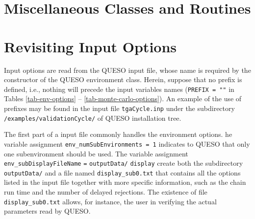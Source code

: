 \section{Miscellaneous Classes and Routines}

% 
% 
% 



\section{Revisiting Input Options}

Input options are read from the QUESO input file, whose name is required by the constructor of the QUESO environment class. Herein, suppose that no prefix is defined, i.e., nothing will precede the input variables names (\verb+PREFIX = ""+ in Tables \ref{tab-env-options} -- \ref{tab-monte-carlo-options}). An example of the use of prefixes may be found in the input file \texttt{tgaCycle.inp} under the subdirectory  \texttt{/examples/validationCycle/} of QUESO installation tree.

The first part of a input file commonly handles the environment options. he variable assignment \verb+env_numSubEnvironments = 1+ indicates to QUESO that only one subenvironment should be used. The variable assignment \texttt{env\_subDisplayFileName} \texttt{=} \texttt{outputData/} \texttt{display} create both the subdirectory \verb+outputData/+ and a file named \verb+display_sub0.txt+ that contains all the options listed in the input file together with more specific information, such as the chain run time and the number of delayed rejections. The existence of file  \verb+display_sub0.txt+  allows, for instance, the user in verifying the actual parameters read by QUESO.


